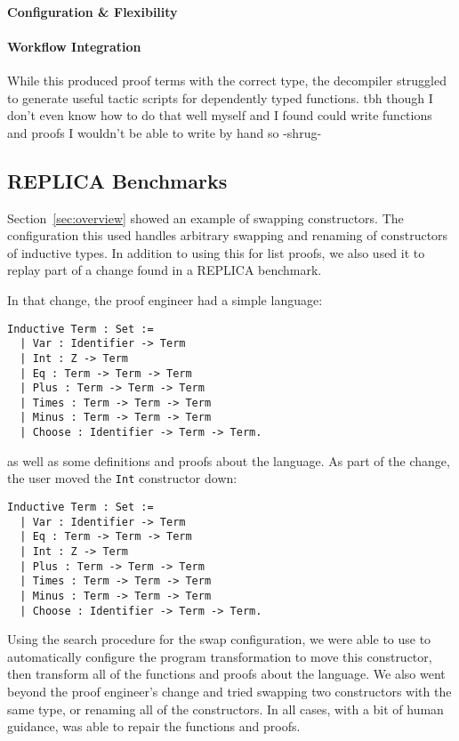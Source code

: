 \paragraph{Configuration \& Flexibility}

\paragraph{Workflow Integration}
While this produced proof terms with the correct type, the decompiler struggled
to generate useful tactic scripts for dependently typed functions.
tbh though I don't even know how to do that well myself and I found \toolname could write
functions and proofs I wouldn't be able to write by hand so -shrug-

\subsection{REPLICA Benchmarks}
\label{sec:replica}

Section~\ref{sec:overview} showed an example of swapping constructors.
The configuration this used handles arbitrary swapping and renaming of constructors of inductive types.
In addition to using this for list proofs, we also used it to replay part of a change found in
a REPLICA benchmark.

In that change, the proof engineer had a simple language:

\begin{lstlisting}
Inductive Term : Set :=
  | Var : Identifier -> Term
  | Int : Z -> Term
  | Eq : Term -> Term -> Term
  | Plus : Term -> Term -> Term
  | Times : Term -> Term -> Term
  | Minus : Term -> Term -> Term
  | Choose : Identifier -> Term -> Term.
\end{lstlisting}
as well as some definitions and proofs about the language.
As part of the change, the user moved the \lstinline{Int} constructor down:

\begin{lstlisting}
Inductive Term : Set :=
  | Var : Identifier -> Term
  | Eq : Term -> Term -> Term
  | Int : Z -> Term
  | Plus : Term -> Term -> Term
  | Times : Term -> Term -> Term
  | Minus : Term -> Term -> Term
  | Choose : Identifier -> Term -> Term.
\end{lstlisting}

Using the search procedure for the swap configuration, we were able to use \toolname
to automatically configure the program transformation to move this constructor,
then transform all of the functions and proofs about the language.
We also went beyond the proof engineer's change and tried swapping two constructors with the same type,
or renaming all of the constructors.
In all cases, with a bit of human guidance, \toolname was able to repair the functions and proofs.

